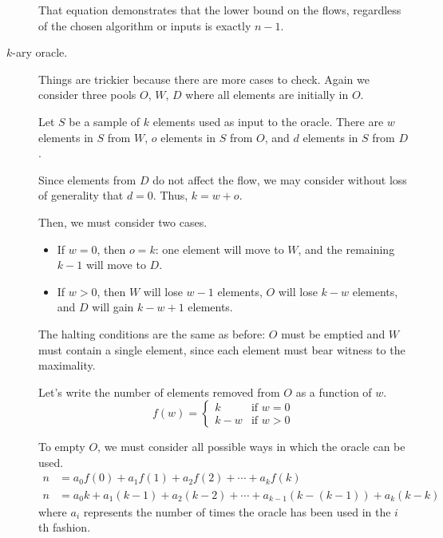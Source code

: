 \documentclass{article}
\begin{document}
\begin{description}
        That equation demonstrates that the lower bound on the flows,
        regardless of the chosen algorithm or inputs is exactly $n - 1$.

    \item[$k$-ary oracle.] Things are trickier because there are more cases to
        check. Again we consider three pools $O$, $W$, $D$ where all elements
        are initially in $O$.

        Let $S$ be a sample of $k$ elements used as input to the oracle. There
        are $w$ elements in $S$ from $W$, $o$ elements in $S$ from $O$, and $d$
        elements in $S$ from $D$.

        Since elements from $D$ do not affect the flow, we may consider without
        loss of generality that $d = 0$. Thus, $k = w + o$.

        Then, we must consider two cases.
        \begin{itemize}
            \item If $w = 0$, then $o = k$: one element will move to $W$, and
                the remaining $k-1$ will move to $D$.
            \item If $w > 0$, then $W$ will lose $w - 1$ elements, $O$ will
                lose $k - w$ elements, and $D$ will gain $k - w + 1$ elements.
        \end{itemize}

        The halting conditions are the same as before: $O$ must be emptied and
        $W$ must contain a single element, since each element must bear witness
        to the maximality.

        Let's write the number of elements removed from $O$ as a function of
        $w$.
        $$
        f(w) = \begin{cases}
            k & \text{if } w = 0 \\
            k - w & \text{if } w > 0
        \end{cases}
        $$

        To empty $O$, we must consider all possible ways in which the oracle
        can be used.
        \begin{align*}
            n &= a_0 f(0) + a_1 f(1) + a_2 f(2) + \cdots + a_k f(k) \\
            n &= a_0 k + a_1 (k - 1) + a_2 (k - 2) + \cdots + a_{k-1} (k - (k-1)) + a_k (k - k)
        \end{align*}
        where $a_i$ represents the number of times the oracle has been used in
        the $i$th fashion.


\end{description}
\end{document}
